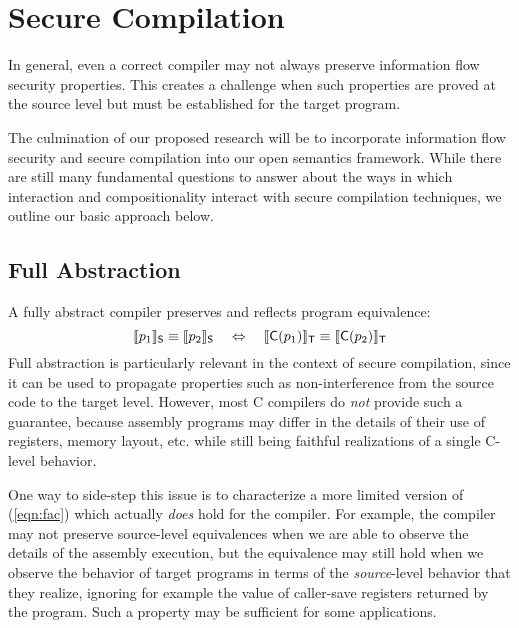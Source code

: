 \section{Secure Compilation}
\label{sec:compcertox}

In general,
even a correct compiler may not always preserve
information flow security properties.
This creates a challenge when such properties
are proved at the source level
but must be established for the target program.

The culmination of our proposed research will be to incorporate
information flow security and secure compilation
into our open semantics framework.
While there are still many fundamental questions to answer
about the ways in which interaction and compositionality
interact with secure compilation techniques,
we outline our basic approach below.

\subsection{Full Abstraction}

A fully abstract compiler preserves and reflects program equivalence:
\begin{equation} \label{eqn:fac}
  \llbracket p_1 \rrbracket_{ \mathsf{S} } \equiv
  \llbracket p_2 \rrbracket_{ \mathsf{S} }
  \quad \Leftrightarrow \quad
  \llbracket  \mathsf{C} (p_1) \rrbracket_{ \mathsf{T} } \equiv
  \llbracket  \mathsf{C} (p_2) \rrbracket_{ \mathsf{T} }
\end{equation}
Full abstraction is particularly relevant
in the context of secure compilation,
since it can be used to propagate properties such as non-interference
from the source code to the target level.
However,
most C compilers do \emph{not} provide such a guarantee,
because assembly programs may differ in the details
of their use of registers, memory layout, etc.
while still being faithful realizations of a single C-level behavior.

One way to side-step this issue
is to characterize a more limited version of (\ref{eqn:fac})
which actually \emph{does} hold for the compiler.
For example,
the compiler may not preserve source-level equivalences
when we are able to observe the details of the assembly execution,
but the equivalence may still hold when
we observe the behavior of target programs
in terms of the \emph{source}-level behavior that they realize,
ignoring for example the value of caller-save registers
returned by the program.
Such a property may be sufficient for some applications.


